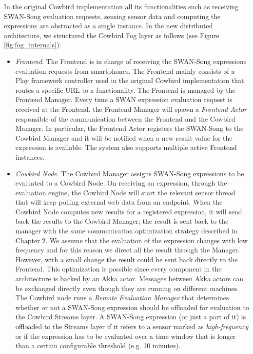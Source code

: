 In the original Cowbird implementation all its functionalities such as receiving SWAN-Song evaluation requests, sensing sensor data and computing the expressions are abstracted as a single instance. In the new distributed architecture, we structured the Cowbird Fog layer as follows (see Figure \ref{fig:fog_internals}):
\begin{itemize}
\item \emph{Frontend}. The Frontend is in charge of receiving the SWAN-Song expressions evaluation requests from smartphones. The Frontend mainly consists of a Play framework controller used in the original Cowbird implementation that routes a specific URL to a functionality. The Frontend is managed by the Frontend Manager. Every time a SWAN expression evaluation request is received at the Frontend, the Frontend Manager will spawn a \emph{Frontend Actor} responsible of the communication between the Frontend and the Cowbird Manager. In particular, the Frontend Actor registers the SWAN-Song to the Cowbird Manager and it will be notified when a new result value for the expression is available. The system also supports multiple active Frontend instances. %

\item	 \emph{Cowbird Node}. The Cowbird Manager assigns SWAN-Song expressions to be evaluated to a Cowbird Node. On receiving an expression, through the evaluation engine, the Cowbird Node will start the relevant sensor thread that will keep polling external web data from an endpoint. When the Cowbird Node computes new results for a registered expression, it will send back the results to the Cowbird Manager; the result is sent back to the manager with the same communication optimization strategy described in Chapter 2. We assume that the evaluation of the expression changes with low frequency and for this reason we direct all the result through the Manager. However, with a small change the result could be sent back directly to the Frontend. This optimization is possible since every component in the architecture is backed by an Akka actor. Messages between Akka actors can be exchanged directly even though they are running on different machines. The Cowbird node runs a \emph{Remote Evaluation Manager} that determines whether or not a SWAN-Song expression should be offloaded for evaluation to the Cowbird Streams layer. A SWAN-Song expression (or just a part of it) is offloaded to the Streams layer if it refers to a sensor marked as \emph{high-frequency} or if the expression has to be evaluated over a time window that is longer than a certain configurable threshold (e.g. 10 minutes).


\end{itemize}
